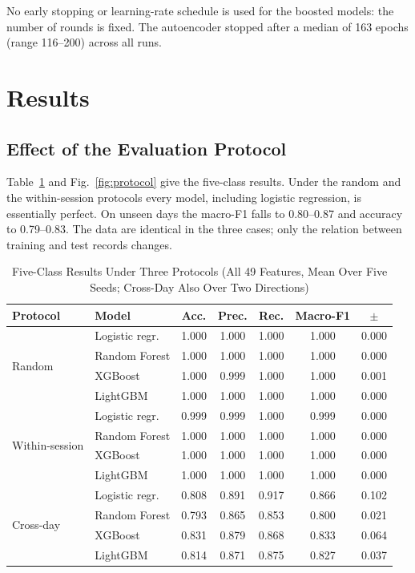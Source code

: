 \documentclass[journal]{IEEEtran}
\begin{document}
No early stopping or learning-rate schedule is used for the boosted models: the number of rounds is fixed. The autoencoder stopped after a median of 163 epochs (range 116--200) across all runs.

\section{Results}\label{sec:results}
\subsection{Effect of the Evaluation Protocol}\label{sec:res-protocol}
Table~\ref{tab:protocol} and Fig.~\ref{fig:protocol} give the five-class results. Under the random and the within-session protocols every model, including logistic regression, is essentially perfect. On unseen days the macro-F1 falls to 0.80--0.87 and accuracy to 0.79--0.83. The data are identical in the three cases; only the relation between training and test records changes.

\begin{table}[t]
\caption{Five-Class Results Under Three Protocols (All 49 Features, Mean Over Five Seeds; Cross-Day Also Over Two Directions)}\label{tab:protocol}
\centering\footnotesize
\setlength{\tabcolsep}{3.5pt}
\begin{tabular}{@{}llccccc@{}}
\toprule
Protocol & Model & Acc. & Prec. & Rec. & Macro-F1 & $\pm$ \\
\midrule
\multirow{4}{*}{Random} & Logistic regr. & 1.000 & 1.000 & 1.000 & 1.000 & 0.000 \\
 & Random Forest & 1.000 & 1.000 & 1.000 & 1.000 & 0.000 \\
 & XGBoost & 1.000 & 0.999 & 1.000 & 1.000 & 0.001 \\
 & LightGBM & 1.000 & 1.000 & 1.000 & 1.000 & 0.000 \\
\midrule
\multirow{4}{*}{Within-session} & Logistic regr. & 0.999 & 0.999 & 1.000 & 0.999 & 0.000 \\
 & Random Forest & 1.000 & 1.000 & 1.000 & 1.000 & 0.000 \\
 & XGBoost & 1.000 & 1.000 & 1.000 & 1.000 & 0.000 \\
 & LightGBM & 1.000 & 1.000 & 1.000 & 1.000 & 0.000 \\
\midrule
\multirow{4}{*}{Cross-day} & Logistic regr. & 0.808 & 0.891 & 0.917 & 0.866 & 0.102 \\
 & Random Forest & 0.793 & 0.865 & 0.853 & 0.800 & 0.021 \\
 & XGBoost & 0.831 & 0.879 & 0.868 & 0.833 & 0.064 \\
 & LightGBM & 0.814 & 0.871 & 0.875 & 0.827 & 0.037 \\
\bottomrule
\end{tabular}
\end{table}
\end{document}
